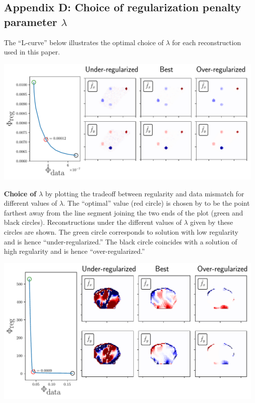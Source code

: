 \documentclass[aps,prl,reprint,groupedaddress,twocolumn]{revtex4-1}
\begin{document}
\begin{appendix}
\section*{Appendix D: Choice of regularization penalty parameter $\lambda$}

The ``L-curve'' below illustrates the optimal choice of $\lambda$ for each reconstruction
used in this paper. 

\begin{suppfigure}[h]
\includegraphics[width=\linewidth]{figD1}
\caption{\textbf{Choice of $\lambda$} by plotting the tradeoff between
  regularity and data mismatch for different values of $\lambda$. The
  ``optimal'' value (red circle) is chosen by to be the point farthest
  away from the line segment joining the two ends of the plot (green
  and black circles).  Reconstructions under the different values of
  $\lambda$ given by these circles are shown. The green circle
  corresponds to solution with low regularity and is hence
  ``under-regularized.'' The black circle coincides with a solution of
  high regularity and is hence ``over-regularized.''}
\label{LAMBDA}
\end{suppfigure}




\begin{suppfigure}[h]
\includegraphics[width=0.95\linewidth]{figD2}
\caption{}
\label{LAMBDA2}
\end{suppfigure}



\end{appendix}
\end{document}
